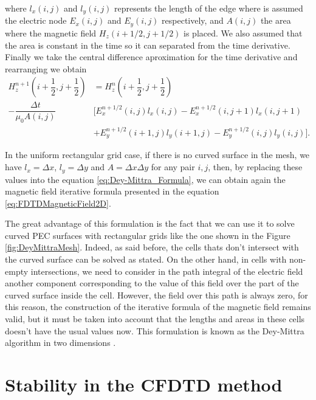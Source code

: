 \documentclass[12pt, oneside]{book}
\begin{document}
where $l_x(i,j)$ and $l_y(i,j)$ represents the length of the edge where is assumed the electric node $E_x(i,j)$ and $E_y(i,j)$ respectively, and $A(i,j)$ the area where the magnetic field $H_z (i + 1/2, j + 1/2)$ is placed. We also assumed that the area is constant in the time so it can separated from the time derivative. Finally we take the central difference aproximation for the time derivative and rearranging we obtain
\begin{equation}
    \begin{aligned}
        H_z^{n + 1}\left( i + \dfrac{1}{2}, j + \dfrac{1}{2} \right) &= H_z^{n}\left( i + \dfrac{1}{2}, j + \dfrac{1}{2} \right)  \\
        - \dfrac{\Delta t}{\mu_0 A(i,j)} & \big[ E^{n + 1/2}_x(i,j) l_x(i,j)- E^{n + 1/2}_x(i,j+1) l_x(i,j+1)  \\
                                                                       &+  E^{n + 1/2}_y(i+1,j) l_y(i+1,j) - E^{n + 1/2}_y(i,j) l_y(i,j)\big].  
    \end{aligned}
\label{eq:Dey-Mittra_Formula}
\end{equation}

In the uniform rectangular grid case, if there is no curved surface in the mesh, we have $l_x = \Delta x$, $l_y = \Delta y$ and $A = \Delta x \Delta y$ for any pair $i,j$, then, by replacing these values into the equation \ref{eq:Dey-Mittra_Formula}, we can obtain again the magnetic field iterative formula presented in the equation \ref{eq:FDTDMagneticField2D}.

The great advantage of this formulation is the fact that we can use it to solve curved PEC surfaces with rectangular grids like the one shown in the Figure \ref{fig:DeyMittraMesh}. Indeed, as said before, the cells thats don't intersect with the curved surface can be solved as stated. On the other hand, in cells with non-empty intersections, we need to consider in the path integral of the electric field another component corresponding to the value of this field over the part of the curved surface inside the cell. However, the field over this path is always zero, for this reason, the construction of the iterative formula of the magnetic field remains valid, but it must be taken into account that the lengths and areas in these cells doesn't have the usual values now. This formulation is known as the Dey-Mittra algorithm in two dimensions \cite{DeyMittra1997}.

\section{Stability in the CFDTD method}
\end{document}

